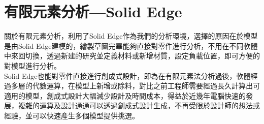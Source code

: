 \section{有限元素分析—Solid Edge}

關於有限元素分析，利用了Solid Edge作為我們的分析環境，選擇的原因在於模型是由Solid Edge建模的，繪製草圖完畢能夠直接對零件進行分析，不用在不同軟體中來回切換，透過新建的研究並定義材料或新增材質，設定負載位置，即可方便的對模型進行分析。\\

Solid Edge也能對零件直接進行創成式設計，即為在有限元素法分析過後，軟體經過多層的代數運算，在模型上新增或除料，對比之前工程師需要經過長久計算出可適用的模型，創成式設計大幅減少設計及時間成本，得益於近幾年電腦快速的發展，複雜的運算及設計通通可以透過創成式設計生成，不再受限於設計師的想法或經驗，並可以快速產生多個模型提供挑選。\\

\newpage
